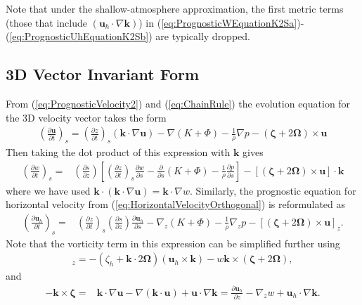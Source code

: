 \documentclass[gmd, manuscript]{copernicus}
\newcommand{\vb}{\mathbf}
\newcommand{\vg}{\boldsymbol}
\newcommand{\pdiff}[2]{\frac{\partial #1}{\partial #2}}
\begin{document}
Note that under the shallow-atmosphere approximation, the first metric terms (those that include $(\vb{u}_h \cdot \nabla \vb{k})$) in (\ref{eq:PrognosticWEquationK2Sa})-(\ref{eq:PrognosticUhEquationK2Sb}) are typically dropped.

\subsection{3D Vector Invariant Form}

From (\ref{eq:PrognosticVelocity2}) and (\ref{eq:ChainRule}) the evolution equation for the 3D velocity vector takes the form
\begin{align}
\left( \pdiff{\vb{u}}{t} \right)_s = \left( \pdiff{z}{t} \right)_s (\vb{k} \cdot \nabla \vb{u}) - \nabla (K + \Phi) - \frac{1}{\rho} \nabla p - (\vg{\zeta} + 2 \vg{\Omega}) \times \vb{u}
\end{align}  Then taking the dot product of this expression with $\vb{k}$ gives
\begin{align} \label{eq:PrognosticWEquation}
\left(\pdiff{w}{t} \right)_s =& \left( \pdiff{s}{z} \right) \left[ \left( \pdiff{z}{t} \right)_s \pdiff{w}{s} - \pdiff{}{s} (K + \Phi) - \frac{1}{\rho} \pdiff{p}{s} \right] - \left[ (\vg{\zeta} + 2 \vg{\Omega}) \times \vb{u} \right] \cdot \vb{k}
\end{align} where we have used $\vb{k} \cdot (\vb{k} \cdot \nabla \vb{u}) = \vb{k} \cdot \nabla w$.
 Similarly, the prognostic equation for horizontal velocity from (\ref{eq:HorizontalVelocityOrthogonal}) is reformulated as
\begin{align} \label{eq:PrognosticUhEquationKS}
\left( \pdiff{\vb{u}_h}{t} \right)_s =& \left( \pdiff{z}{t} \right)_s \left( \pdiff{s}{z} \right) \pdiff{\vb{u}_h}{s} - \nabla_z (K + \Phi) - \frac{1}{\rho} \nabla_z p - \left[ (\vg{\zeta} + 2 \vg{\Omega}) \times \vb{u} \right]_z.
\end{align}  Note that the vorticity term in this expression can be simplified further using
\begin{align}
[(\vg{\zeta} + 2 \vg{\Omega}) \times \vb{u}]_z = - (\zeta_h + \vb{k} \cdot 2 \vg{\Omega}) (\vb{u}_h \times \vb{k}) - w \vb{k} \times (\vg{\zeta} + 2 \vg{\Omega}),
\end{align} and
\begin{align}
- \vb{k} \times \vg{\zeta} =& \vb{k} \cdot \nabla \vb{u} - \nabla (\vb{k} \cdot \vb{u}) + \vb{u} \cdot \nabla \vb{k} = \pdiff{\vb{u}_h}{z} - \nabla_z w + \vb{u}_h \cdot \nabla \vb{k}.
\end{align}
\end{document}
